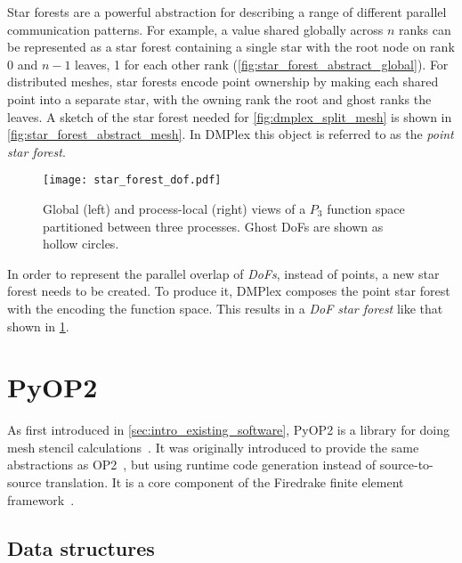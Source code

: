 \documentclass[thesis]{subfiles}
\begin{document}
Star forests are a powerful abstraction for describing a range of different parallel communication patterns.
For example,  a value shared globally across $n$ ranks can be represented as a star forest containing a single star with the root node on rank 0 and $n-1$ leaves, 1 for each other rank (\cref{fig:star_forest_abstract_global}).
For distributed meshes, star forests encode point ownership by making each shared point into a separate star, with the owning rank the root and ghost ranks the leaves.
A sketch of the star forest needed for \cref{fig:dmplex_split_mesh} is shown in \cref{fig:star_forest_abstract_mesh}.
In DMPlex this object is referred to as the \emph{point star forest}.

\begin{figure}
  \centering
  \texttt{[image: star\_forest\_dof.pdf]}

  \caption{
    Global (left) and process-local (right) views of a $P_3$ function space partitioned between three processes.
    Ghost DoFs are shown as hollow circles.
  }
  \label{fig:dmplex_split_function_space}
\end{figure}

In order to represent the parallel overlap of \emph{DoFs}, instead of points, a new star forest needs to be created.
To produce it, DMPlex composes the point star forest with the  encoding the function space.
This results in a \emph{DoF star forest} like that shown in \cref{fig:dmplex_split_function_space}.

\section{PyOP2}


As first introduced in \cref{sec:intro_existing_software}, PyOP2 is a library for doing mesh stencil calculations~\cite{rathgeberPyOP2HighLevelFramework2012}.
It was originally introduced to provide the same abstractions as OP2~\cite{mudaligeOP2ActiveLibrary2012}, but using runtime code generation instead of source-to-source translation.
It is a core component of the Firedrake finite element framework~\cite{FiredrakeUserManual}.

\subsection{Data structures}
\end{document}

